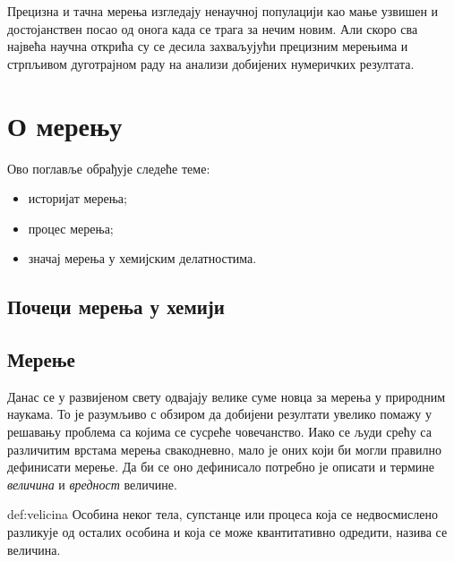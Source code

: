 \begin{savequote}
	Прецизна и тачна мерења изгледају ненаучној популацији
	као мање узвишен и достојанствен посао од онога када
	се трага за нечим новим. Али скоро сва највећа научна
	открића су се десила захваљујући прецизним мерењима и
	стрпљивом дуготрајном раду на анализи добијених нумеричких
	резултата.
\end{savequote}
\chapter{О мерењу}

\begin{sazetak}
  Ово поглавље обрађује следеће теме:\\[2mm]
  \begin{itemize}
  \item историјат мерења;
  \item процес мерења;
  \item значај мерења у хемијским делатностима.
  \end{itemize}
\end{sazetak}

\section{Почеци мерења у хемији}

\section{Мерење}

Данас се у развијеном свету одвајају велике суме новца за мерења
у природним наукама. То је разумљиво с обзиром да добијени резултати
увелико помажу у решавању проблема са којима се сусреће човечанство.
Иако се људи срећу са различитим врстама мерења свакодневно, мало
је оних који би могли правилно дефинисати мерење. Да би се оно
дефинисало потребно је описати и термине \emph{величина} и
\emph{вредност} величине.

\begin{df}[Величина]{def:velicina}
  Особина неког тела, супстанце или процеса која се недвосмислено
  разликује од осталих особина и која се може квантитативно одредити,
  назива се величина.
\end{df}

